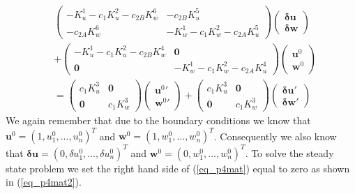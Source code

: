 \documentclass[11pt,fleqn]{article}
\theoremstyle{defstyle}
\begin{document}
\begin{equation}
\begin{aligned}
&\begin{pmatrix}
-K^1_u - c_1K^2_u  -c_{2B}K^6_w & -c_{2B}K^5_u \\
-c_{2A}K^6_w & - K^1_w-c_1 K^2_w -c_{2A}K^5_u
\end{pmatrix} \begin{pmatrix}
\mathbf{\delta u} \\ \mathbf{\delta w} 
\end{pmatrix} \\ 
&+ \begin{pmatrix}
-K^1_u -c_1K^2_u-c_{2B}K^4_w & \mathbf{0} \\
\mathbf{0} & -K^1_w -c_1K^2_w-c_{2A}K^4_u
\end{pmatrix}\begin{pmatrix}
\mathbf{u}^0 \\ \mathbf{w}^0 
\end{pmatrix} \\ 
&= \begin{pmatrix}
c_1K^3_u & \mathbf{0}\\
\mathbf{0} & c_1K^3_w
\end{pmatrix} \begin{pmatrix}
\mathbf{u}^0\prime \\ \mathbf{w}^0\prime 
\end{pmatrix} + \begin{pmatrix}
c_1K^3_u & \mathbf{0} \\
\mathbf{0} & c_1K^3_w
\end{pmatrix}\begin{pmatrix}
\mathbf{\delta u}\prime \\ \mathbf{\delta w}\prime 
\end{pmatrix}
\end{aligned}
\label{eq_p4mat}
\end{equation}
We again remember that due to the boundary conditions we know that $\mathbf{u}^0 = \left(1,u^0_1,...,u^0_n \right)^T$ and $\mathbf{w}^0 = \left(1,w^0_1,...,w^0_n \right)^T$. Consequently we also know that $\mathbf{\delta u} = \left(0,\delta u^0_1,...,\delta u^0_n \right)^T$ and $\mathbf{w}^0 = \left(0,w^0_1,...,w^0_n \right)^T$. To solve the steady state problem we set the right hand side of (\ref{eq_p4mat}) equal to zero as shown in (\ref{eq_p4mat2}). 
\end{document}
